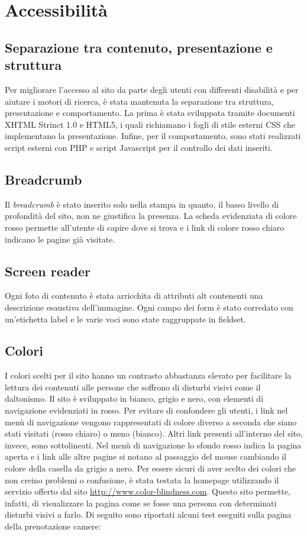 \section{Accessibilità}
\subsection{Separazione tra contenuto, presentazione e struttura}
Per migliorare l'accesso al sito da parte degli utenti con differenti disabilità e per aiutare i motori di ricerca, è stata mantenuta la separazione tra struttura, presentazione e comportamento.
La prima è stata sviluppata tramite documenti XHTML Strinct 1.0 e HTML5, i quali richiamano i fogli di stile esterni CSS che implementano la presentazione.
Infine, per il comportamento, sono stati realizzati script esterni con PHP e script Javascript per il controllo dei dati inseriti.
\subsection{Breadcrumb}
Il \textit{breadcrumb} è stato inserito solo nella stampa in quanto, il basso livello di profondità del sito, non ne giustifica la presenza. La scheda evidenziata di colore rosso permette all'utente di capire dove si trova e i link di colore rosso chiaro indicano le pagine già visitate.
\subsection{Screen reader}
Ogni foto di contenuto è stata arricchita di attributi alt contenenti una descrizione esaustiva dell'immagine.
Ogni campo dei form è stato corredato con un'etichetta label e le varie voci sono state raggruppate in fieldset.
\subsection{Colori}
I colori scelti per il sito hanno un contrasto abbastanza elevato per facilitare la lettura dei contenuti alle persone che soffrono di disturbi visivi come il daltonismo.
Il sito è sviluppato in bianco, grigio e nero, con elementi di navigazione evidenziati in rosso.
Per evitare di confondere gli utenti, i link nel menù di navigazione vengono rappresentati di colore diverso a seconda che siano stati visitati (rosso chiaro) o meno (bianco). Altri link presenti all'interno del sito, invece, sono sottolineati.
Nel menù di navigazione lo sfondo rosso indica la pagina aperta e i link alle altre pagine si notano al passaggio del mouse cambiando il colore della casella da grigio a nero.
Per essere sicuri di aver scelto dei colori che non creino problemi o confusione, è stata testata la homepage utilizzando il servizio offerto dal sito \underline{\color{Blue}http://www.color-blindness.com}.
Questo sito permette, infatti, di visualizzare la pagina come se fosse una persona con determinati disturbi visivi a farlo.
Di seguito sono riportati alcuni test eseguiti sulla pagina della prenotazione camere:

